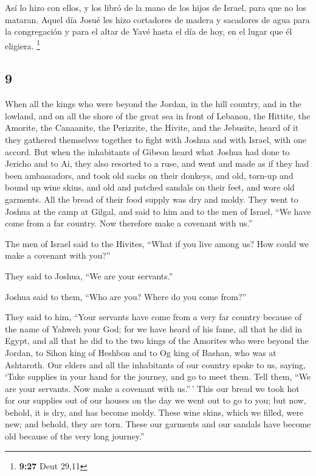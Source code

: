 \begin{paracol}{2}
 Así lo hizo con ellos, y los libró de la mano de los
hijos de Israel, para que no los mataran.  Aquel día
Josué les hizo cortadores de madera y sacadores de agua para la
congregación y para el altar de Yavé hasta el día de hoy, en el lugar
que él eligiera. \footnote{\textbf{9:27} Deut 29,11}

\switchcolumn
\begin{otherlanguage}{english}

\hypertarget{section-17}{%
\section{9}\label{section-17}}

 When all the kings who were beyond the Jordan, in the
hill country, and in the lowland, and on all the shore of the great sea
in front of Lebanon, the Hittite, the Amorite, the Canaanite, the
Perizzite, the Hivite, and the Jebusite, heard of it  they
gathered themselves together to fight with Joshua and with Israel, with
one accord.  But when the inhabitants of Gibeon heard what
Joshua had done to Jericho and to Ai,  they also resorted
to a ruse, and went and made as if they had been ambassadors, and took
old sacks on their donkeys, and old, torn-up and bound up wine skins,
 and old and patched sandals on their feet, and wore old
garments. All the bread of their food supply was dry and moldy.
 They went to Joshua at the camp at Gilgal, and said to
him and to the men of Israel, ``We have come from a far country. Now
therefore make a covenant with us.''

 The men of Israel said to the Hivites, ``What if you live
among us? How could we make a covenant with you?''

 They said to Joshua, ``We are your servants.''

Joshua said to them, ``Who are you? Where do you come from?''

 They said to him, ``Your servants have come from a very
far country because of the name of Yahweh your God; for we have heard of
his fame, all that he did in Egypt,  and all that he did
to the two kings of the Amorites who were beyond the Jordan, to Sihon
king of Heshbon and to Og king of Bashan, who was at Ashtaroth.
 Our elders and all the inhabitants of our country spoke
to us, saying, `Take supplies in your hand for the journey, and go to
meet them. Tell them, ``We are your servants. Now make a covenant with
us.''\,'  This our bread we took hot for our supplies out
of our houses on the day we went out to go to you; but now, behold, it
is dry, and has become moldy.  These wine skins, which we
filled, were new; and behold, they are torn. These our garments and our
sandals have become old because of the very long journey.''


\end{otherlanguage}
\end{paracol}
